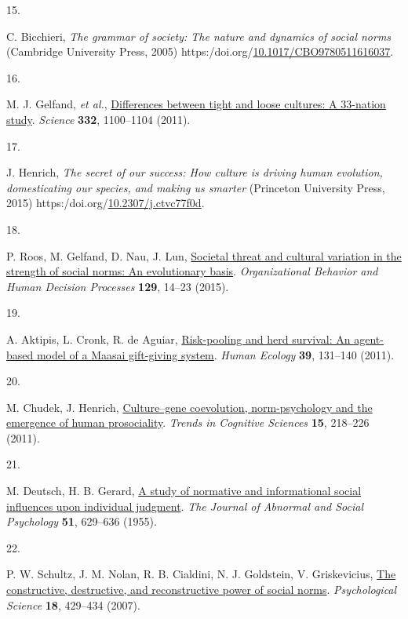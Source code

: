\documentclass[
  man, donotrepeattitle,floatsintext]{apa6}
\newlength{\cslhangindent}
\newlength{\csllabelwidth}
\newlength{\cslentryspacingunit} %
\newenvironment{CSLReferences}[2] %
 {%
  \setlength{\parindent}{0pt}
  \ifodd #1
  \let\oldpar\par
  \def\par{\hangindent=\cslhangindent\oldpar}
  \fi
  \setlength{\parskip}{#2\cslentryspacingunit}
 }%
 {}
\newcommand{\CSLLeftMargin}[1]{\parbox[t]{\csllabelwidth}{#1}}
\newcommand{\CSLRightInline}[1]{\parbox[t]{\linewidth - \csllabelwidth}{#1}\break}
\begin{document}
\begin{CSLReferences}{0}{0}
\leavevmode{}%
\CSLLeftMargin{15. }%
\CSLRightInline{C. Bicchieri, \emph{The grammar of society: The nature and dynamics of social norms} (Cambridge University Press, 2005) https:/doi.org/\href{https://doi.org/10.1017/CBO9780511616037}{10.1017/CBO9780511616037}.}

\leavevmode{}%
\CSLLeftMargin{16. }%
\CSLRightInline{M. J. Gelfand, \emph{et al.}, \href{https://doi.org/10.1126/science.1197754}{Differences between tight and loose cultures: A 33-nation study}. \emph{Science} \textbf{332}, 1100--1104 (2011).}

\leavevmode{}%
\CSLLeftMargin{17. }%
\CSLRightInline{J. Henrich, \emph{The secret of our success: How culture is driving human evolution, domesticating our species, and making us smarter} (Princeton University Press, 2015) https:/doi.org/\href{https://doi.org/10.2307/j.ctvc77f0d}{10.2307/j.ctvc77f0d}.}

\leavevmode{}%
\CSLLeftMargin{18. }%
\CSLRightInline{P. Roos, M. Gelfand, D. Nau, J. Lun, \href{https://doi.org/10.1016/j.obhdp.2015.01.003}{Societal threat and cultural variation in the strength of social norms: An evolutionary basis}. \emph{Organizational Behavior and Human Decision Processes} \textbf{129}, 14--23 (2015).}

\leavevmode{}%
\CSLLeftMargin{19. }%
\CSLRightInline{A. Aktipis, L. Cronk, R. de Aguiar, \href{https://doi.org/10.1007/s10745-010-9364-9}{Risk-pooling and herd survival: An agent-based model of a {M}aasai gift-giving system}. \emph{Human Ecology} \textbf{39}, 131--140 (2011).}

\leavevmode{}%
\CSLLeftMargin{20. }%
\CSLRightInline{M. Chudek, J. Henrich, \href{https://doi.org/10.1016/j.tics.2011.03.003}{Culture--gene coevolution, norm-psychology and the emergence of human prosociality}. \emph{Trends in Cognitive Sciences} \textbf{15}, 218--226 (2011).}

\leavevmode{}%
\CSLLeftMargin{21. }%
\CSLRightInline{M. Deutsch, H. B. Gerard, \href{https://doi.org/10.1037/h0046408}{A study of normative and informational social influences upon individual judgment}. \emph{The Journal of Abnormal and Social Psychology} \textbf{51}, 629--636 (1955).}

\leavevmode{}%
\CSLLeftMargin{22. }%
\CSLRightInline{P. W. Schultz, J. M. Nolan, R. B. Cialdini, N. J. Goldstein, V. Griskevicius, \href{https://doi.org/10.1111/j.1467-9280.2007.01917.x}{The constructive, destructive, and reconstructive power of social norms}. \emph{Psychological Science} \textbf{18}, 429--434 (2007).}


\end{CSLReferences}
\end{document}
